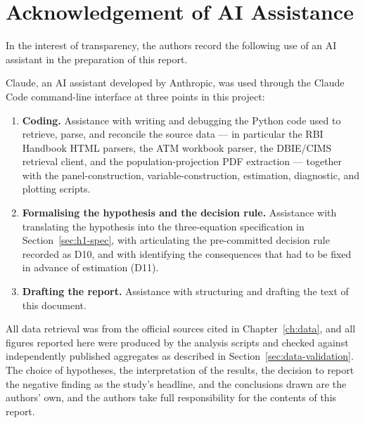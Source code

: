 \chapter*{Acknowledgement of AI Assistance}

In the interest of transparency, the authors record the following use of an AI assistant in the
preparation of this report.

Claude, an AI assistant developed by Anthropic, was used through the Claude Code command-line
interface \citep{claude} at three points in this project:

\begin{enumerate}[leftmargin=*,itemsep=5pt]

\item \textbf{Coding.} Assistance with writing and debugging the Python code used to retrieve,
parse, and reconcile the source data --- in particular the RBI Handbook HTML parsers, the ATM
workbook parser, the DBIE/CIMS retrieval client, and the population-projection PDF extraction ---
together with the panel-construction, variable-construction, estimation, diagnostic, and plotting
scripts.

\item \textbf{Formalising the hypothesis and the decision rule.} Assistance with translating the
hypothesis into the three-equation specification in Section~\ref{sec:h1-spec}, with articulating
the pre-committed decision rule recorded as D10, and with identifying the consequences that had to
be fixed in advance of estimation (D11).

\item \textbf{Drafting the report.} Assistance with structuring and drafting the text of this
document.

\end{enumerate}

\noindent
All data retrieval was from the official sources cited in Chapter~\ref{ch:data}, and all figures
reported here were produced by the analysis scripts and checked against
independently published aggregates as described in Section~\ref{sec:data-validation}. The choice
of hypotheses, the interpretation of the results, the decision to report the negative finding as
the study's headline, and the conclusions drawn are the authors' own, and the authors take full
responsibility for the contents of this report.

